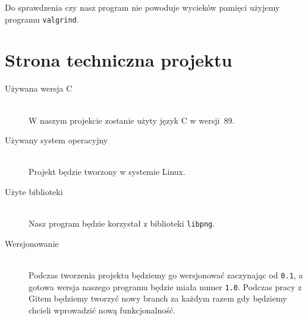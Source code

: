 \documentclass[a4paper,11pt, notitlepage ]{article}
\begin{document}
Do sprawdzenia czy nasz program nie powoduje wycieków pamięci użyjemy programu \verb+valgrind+.

\section{Strona techniczna projektu}
\begin{description}
\item[Używana wersja C]\hfill \\
 W naszym projekcie zostanie użyty język C w wersji~89.
\item[Używany system operacyjny]\hfill \\
 Projekt będzie tworzony w systemie Linux.
\item[Użyte biblioteki]\hfill \\
 Nasz program będzie korzystał z biblioteki \verb+libpng+.
\item[Wersjonowanie]\hfill \\
 Podczas tworzenia projektu będziemy go wersjonować zaczynając od \verb+0.1+, a gotowa wersja naszego programu będzie miała numer \verb+1.0+. Podczas pracy z Gitem będziemy tworzyć nowy branch za każdym razem gdy będziemy chcieli wprowadzić nową funkcjonalność.



\end{description}
\end{document}
